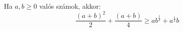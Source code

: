   Ha $a,b\ge 0$ valós számok, akkor:
   \begin{equation*}
   \frac{(a+b)^2}{2}+\frac{(a+b)}{4} \ge a{b}^{\frac{1}{2}}+ {a}^{\frac{1}{2}}b
   \end{equation*}
